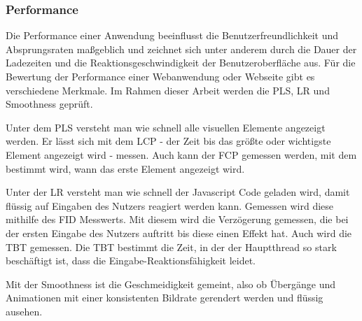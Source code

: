 \subsubsection{Performance}\label{sec:PerformanceBasics}
Die Performance einer Anwendung beeinflusst die Benutzerfreundlichkeit und Absprungsraten maßgeblich und zeichnet sich unter anderem durch die Dauer der Ladezeiten und die Reaktionsgeschwindigkeit der Benutzeroberfläche aus. Für die Bewertung der Performance einer Webanwendung oder Webseite gibt es verschiedene Merkmale. Im Rahmen dieser Arbeit werden die \ac{PLS}, \ac{LR} und Smoothness geprüft. 

Unter dem \ac{PLS} versteht man wie schnell alle visuellen Elemente angezeigt werden. Er lässt sich mit dem \ac{LCP} - der Zeit bis das größte oder wichtigste Element angezeigt wird - messen. Auch kann der \ac{FCP} gemessen werden, mit dem bestimmt wird, wann das erste Element angezeigt wird.

Unter der \ac{LR} versteht man wie schnell der Javascript Code geladen wird, damit flüssig auf Eingaben des Nutzers reagiert werden kann. Gemessen wird diese mithilfe des \ac{FID} Messwerts. Mit diesem wird die Verzögerung gemessen, die bei der ersten Eingabe des Nutzers auftritt bis diese einen Effekt hat. Auch wird die \ac{TBT} gemessen. Die \ac{TBT} bestimmt die Zeit, in der der Hauptthread so stark beschäftigt ist, dass die Eingabe-Reaktionsfähigkeit leidet.

Mit der Smoothness ist die Geschmeidigkeit gemeint, also ob Übergänge und Animationen mit einer konsistenten Bildrate gerendert werden und flüssig ausehen.
